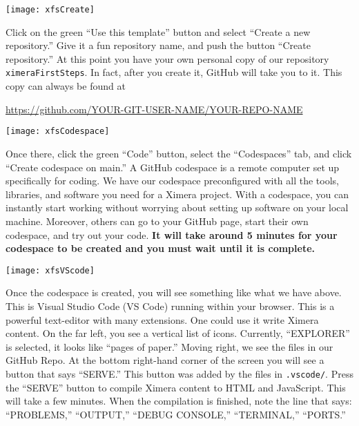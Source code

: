 \documentclass{ximera}
\begin{document}
\begin{image}
    \texttt{[image: xfsCreate]}
\end{image}
        Click on the green ``Use this template'' button and select ``Create a
        new repository.'' Give it a fun repository name, and push the button
        ``Create repository.''
        At this point you have your own personal copy of our repository
        \verb!ximeraFirstSteps!.
        In fact, after you create it, GitHub will take you to it. This copy can
        always
        be found at
        \begin{center}
            \url{https://github.com/YOUR-GIT-USER-NAME/YOUR-REPO-NAME}
        \end{center}
        \newpage
        \pdfOnly{\end{multicols}}
\begin{image}
    \texttt{[image: xfsCodespace]}
\end{image}
        Once there, click the green ``Code'' button, select
        the ``Codespaces'' tab, and click ``Create codespace on main.''
        A GitHub codespace is a remote computer set up specifically for coding.
        We have our codespace preconfigured with all the tools, libraries, and
        software
        you need for a Ximera
        project. With a codespace, you can instantly start working
        without worrying about setting up software on your local machine.
        Moreover,
        others can go to your GitHub page, start their own codespace, and try
        out your
        code.
        \textbf{It will take around 5 minutes for your codespace to be created
            and you
            must wait until it is complete.}
        \pdfOnly{\end{multicols}}

\newpage

\begin{image}
    \texttt{[image: xfsVScode]}
\end{image}
        Once the codespace is created, you will see something like what we have
        above.
        This is Visual Studio Code (VS Code) running within your browser. This
        is a powerful text-editor with many extensions. One could use it write Ximera
        content.  On the far left, you see a
        vertical list of icons. Currently, ``EXPLORER'' is selected, it looks
        like
        ``pages of paper.'' Moving right, we see the files in our GitHub Repo.
        At the bottom right-hand corner of the screen you will see a button
        that says
        ``SERVE.'' This button was added by the files in \verb!.vscode/!.
        Press the ``SERVE'' button to compile Ximera content to HTML and
        JavaScript.
        This will take a few minutes. When the compilation is finished, note the line that says:
        ``PROBLEMS,'' ``OUTPUT,'' ``DEBUG CONSOLE,'' ``TERMINAL,'' ``PORTS.''
        \pdfOnly{\end{multicols}}
\end{document}
